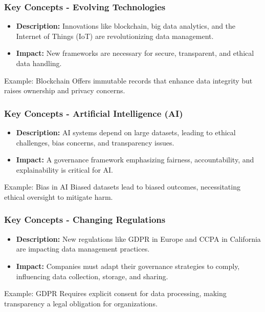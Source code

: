 \documentclass{beamer}
\begin{document}
\begin{frame}[fragile]
    \frametitle{Key Concepts - Evolving Technologies}
    \begin{itemize}
        \item \textbf{Description:} Innovations like blockchain, big data analytics, and the Internet of Things (IoT) are revolutionizing data management.
        \item \textbf{Impact:} New frameworks are necessary for secure, transparent, and ethical data handling.
    \end{itemize}
    
    \begin{block}{Example: Blockchain}
        Offers immutable records that enhance data integrity but raises ownership and privacy concerns.
    \end{block}
\end{frame}

\begin{frame}[fragile]
    \frametitle{Key Concepts - Artificial Intelligence (AI)}
    \begin{itemize}
        \item \textbf{Description:} AI systems depend on large datasets, leading to ethical challenges, bias concerns, and transparency issues.
        \item \textbf{Impact:} A governance framework emphasizing fairness, accountability, and explainability is critical for AI.
    \end{itemize}
    
    \begin{block}{Example: Bias in AI}
        Biased datasets lead to biased outcomes, necessitating ethical oversight to mitigate harm.
    \end{block}
\end{frame}

\begin{frame}[fragile]
    \frametitle{Key Concepts - Changing Regulations}
    \begin{itemize}
        \item \textbf{Description:} New regulations like GDPR in Europe and CCPA in California are impacting data management practices.
        \item \textbf{Impact:} Companies must adapt their governance strategies to comply, influencing data collection, storage, and sharing.
    \end{itemize}
    
    \begin{block}{Example: GDPR}
        Requires explicit consent for data processing, making transparency a legal obligation for organizations.
    \end{block}
\end{frame}
\end{document}
